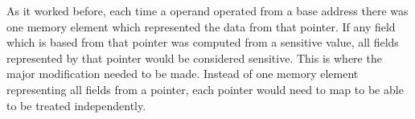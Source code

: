 \documentclass[11pt,a4paper]{article}
\begin{document}
  As it worked before, each time a operand operated from a base address
  there was one memory element which represented the data from that pointer. If
  any field which is based from that pointer was computed from a sensitive
  value, all fields represented by that pointer would be considered sensitive.
  This is where the major modification needed to be made. Instead of one memory
  element representing all fields from a pointer, each pointer would need to map
  to be able to be treated independently.

\end{document}
